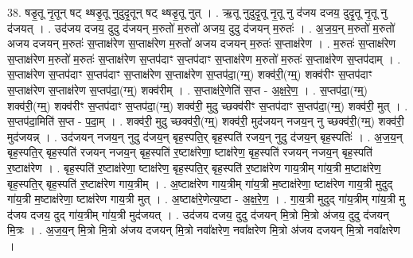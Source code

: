 \documentclass[17pt]{extarticle}
\begin{document}
38. षडृ॒तू नृ॒तून् षट् थ्षडृ॒तू नुदुदृ॒तून् षट् थ्षडृ॒तू नुत् । . ऋ॒तू नुदुदृ॒तू नृ॒तू नु द॑जय दजय॒ दुदृ॒तू नृ॒तू नु द॑जयत् । . उद॑जय दजय॒ दुदु द॑जयन् म॒रुतो॑ म॒रुतो॑ अजय॒ दुदु द॑जयन् म॒रुतः॑ । . अ॒ज॒य॒न् म॒रुतो॑ म॒रुतो॑ अजय दजयन् म॒रुतः॑ स॒प्ताक्ष॑रेण स॒प्ताक्ष॑रेण म॒रुतो॑ अजय दजयन् म॒रुतः॑ स॒प्ताक्ष॑रेण । . म॒रुतः॑ स॒प्ताक्ष॑रेण स॒प्ताक्ष॑रेण म॒रुतो॑ म॒रुतः॑ स॒प्ताक्ष॑रेण स॒प्तप॑दाꣳ स॒प्तप॑दाꣳ स॒प्ताक्ष॑रेण म॒रुतो॑ म॒रुतः॑ स॒प्ताक्ष॑रेण स॒प्तप॑दाम् । . स॒प्ताक्ष॑रेण स॒प्तप॑दाꣳ स॒प्तप॑दाꣳ स॒प्ताक्ष॑रेण स॒प्ताक्ष॑रेण स॒प्तप॑दा॒(ग्म्॒) शक्व॑री॒(ग्म्॒) शक्व॑रीꣳ स॒प्तप॑दाꣳ स॒प्ताक्ष॑रेण स॒प्ताक्ष॑रेण स॒प्तप॑दा॒(ग्म्॒) शक्व॑रीम् । . स॒प्ताक्ष॑रे॒णेति॑ स॒प्त - अ॒क्ष॒रे॒ण॒ । . स॒प्तप॑दा॒(ग्म्॒) शक्व॑री॒(ग्म्॒) शक्व॑रीꣳ स॒प्तप॑दाꣳ स॒प्तप॑दा॒(ग्म्॒) शक्व॑री॒ मुदु च्छक्व॑रीꣳ स॒प्तप॑दाꣳ स॒प्तप॑दा॒(ग्म्॒) शक्व॑री॒ मुत् । . स॒प्तप॑दा॒मिति॑ स॒प्त - प॒दा॒म् । . शक्व॑री॒ मुदु च्छक्व॑री॒(ग्म्॒) शक्व॑री॒ मुद॑जयन् नजय॒न् नु च्छक्व॑री॒(ग्म्॒) शक्व॑री॒ मुद॑जयन्न् । . उद॑जयन् नजय॒न् नुदु द॑जय॒न् बृह॒स्पति॒र् बृह॒स्पति॑ रजय॒न् नुदु द॑जय॒न् बृह॒स्पतिः॑ । . अ॒ज॒य॒न् बृह॒स्पति॒र् बृह॒स्पति॑ रजयन् नजय॒न् बृह॒स्पति॑ र॒ष्टाक्ष॑रेणा॒ ष्टाक्ष॑रेण॒ बृह॒स्पति॑ रजयन् नजय॒न् बृह॒स्पति॑ र॒ष्टाक्ष॑रेण । . बृह॒स्पति॑ र॒ष्टाक्ष॑रेणा॒ ष्टाक्ष॑रेण॒ बृह॒स्पति॒र् बृह॒स्पति॑ र॒ष्टाक्ष॑रेण गाय॒त्रीम् गा॑य॒त्री म॒ष्टाक्ष॑रेण॒ बृह॒स्पति॒र् बृह॒स्पति॑ र॒ष्टाक्ष॑रेण गाय॒त्रीम् । . अ॒ष्टाक्ष॑रेण गाय॒त्रीम् गा॑य॒त्री म॒ष्टाक्ष॑रेणा॒ ष्टाक्ष॑रेण गाय॒त्री मुदुद् गा॑य॒त्री म॒ष्टाक्ष॑रेणा॒ ष्टाक्ष॑रेण गाय॒त्री मुत् । . अ॒ष्टाक्ष॑रे॒णेत्य॒ष्टा - अ॒क्ष॒रे॒ण॒ । . गा॒य॒त्री मुदुद् गा॑य॒त्रीम् गा॑य॒त्री मु द॑जय दजय॒ दुद् गा॑य॒त्रीम् गा॑य॒त्री मुद॑जयत् । . उद॑जय दजय॒ दुदु द॑जयन् मि॒त्रो मि॒त्रो अ॑जय॒ दुदु द॑जयन् मि॒त्रः । . अ॒ज॒य॒न् मि॒त्रो मि॒त्रो अ॑जय दजयन् मि॒त्रो नवा᳚क्षरेण॒ नवा᳚क्षरेण मि॒त्रो अ॑जय दजयन् मि॒त्रो नवा᳚क्षरेण । \newline
\end{document}
